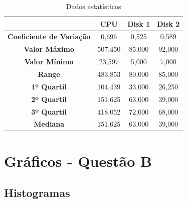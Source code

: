\documentclass[11pt,a4paper,openany,oneside]{abntex2}
\begin{document}
\begin{table}[htbp]
	\caption{Dados  estatísticos}
	\centering
	\begin{tabular}{|c|c|c|c|}
		\hline
		& \textbf{CPU} & \textbf{Disk 1} & \textbf{Disk 2} \\ \hline
		\hline
		\textbf{Coeficiente de Variação} & 0,696 & 0,525 & 0,589 \\ \hline
		\textbf{Valor Máximo} & 507,450 & 85,000 & 92,000 \\ \hline
		\textbf{Valor Mínimo} & 23,597 & 5,000 & 7,000 \\ \hline
		\textbf{Range} & 483,853 & 80,000 & 85,000 \\ \hline
		\textbf{1º Quartil} & 104,439 & 33,000 & 26,250 \\ \hline
		\textbf{2º Quartil} & 151,625 & 63,000 & 39,000 \\ \hline
		\textbf{3º Quartil} & 418,052 & 72,000 & 68,000 \\ \hline
		\textbf{Mediana} & 151,625 & 63,000 & 39,000 \\ \hline
	\end{tabular}
	\label{dadosestat}
\end{table}


\chapter{Gráficos - Questão B}

\section{\textbf{Histogramas}}
\end{document}
